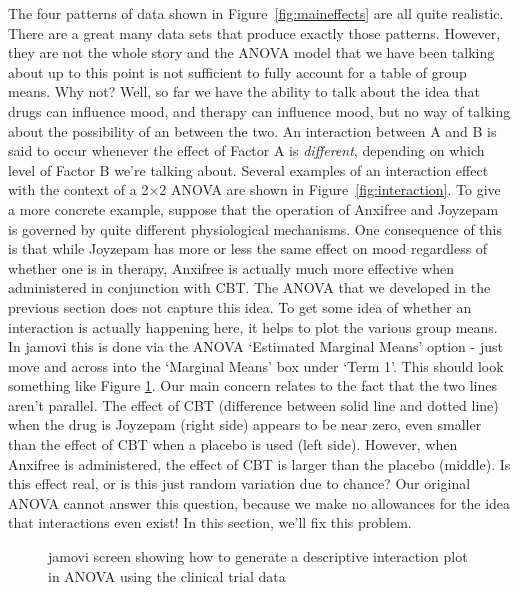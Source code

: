 The four patterns of data shown in Figure~\ref{fig:maineffects} are all quite realistic. There are a great many data sets that produce exactly those patterns. However, they are not the whole story and the ANOVA model that we have been talking about up to this point is not sufficient to fully account for a table of group means. Why not? Well, so far we have the ability to talk about the idea that drugs can influence mood, and therapy can influence mood, but no way of talking about the possibility of an  between the two. An interaction between A and B is said to occur whenever the effect of Factor A is {\it different}, depending on which level of Factor B we're talking about. Several examples of an interaction effect with the context of a 2$\times$2 ANOVA are shown in Figure~\ref{fig:interaction}. To give a more concrete example, suppose that the operation of Anxifree and Joyzepam is governed by quite different physiological mechanisms. One consequence of this is that while Joyzepam has more or less the same effect on mood regardless of whether one is in therapy, Anxifree is actually much more effective when administered in conjunction with CBT. The ANOVA that we developed in the previous section does not capture this idea. To get some idea of whether an interaction is actually happening here, it helps to plot the various group means. In jamovi this is done via the ANOVA `Estimated Marginal Means' option - just move  and  across into the `Marginal Means' box under `Term 1'. This should look something like Figure \ref{fig:interactionplot}. Our main concern relates to the fact that the two lines aren't parallel. The effect of CBT (difference between solid line and dotted line) when the drug is Joyzepam (right side) appears to be near zero, even smaller than the effect of CBT when a placebo is used (left side). However, when Anxifree is administered, the effect of CBT is larger than the placebo (middle). Is this effect real, or is this just random variation due to chance? Our original ANOVA cannot answer this question, because we make no allowances for the idea that interactions even exist! In this section, we'll fix this problem.

\vspace{0.5cm}
\begin{figure}[!htb]
\begin{center}
\caption{jamovi screen showing how to generate a descriptive interaction plot in ANOVA using the clinical trial data}
\label{fig:interactionplot}
\HR
\end{center}
\end{figure}

